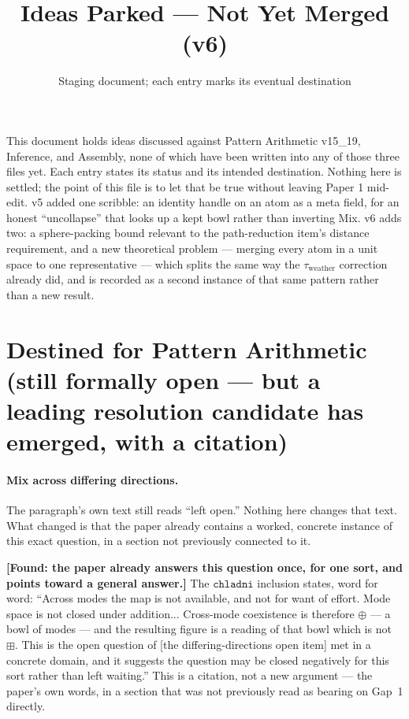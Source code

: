 \documentclass[11pt]{article}
\title{Ideas Parked --- Not Yet Merged (v6)}
\author{Staging document; each entry marks its eventual destination}
\date{}
\begin{document}
\maketitle

\noindent This document holds ideas discussed against Pattern Arithmetic
v15\_19, Inference, and Assembly, none of which have been written into
any of those three files yet. Each entry states its status and its
intended destination. Nothing here is settled; the point of this file
is to let that be true without leaving Paper 1 mid-edit.
v5 added one scribble: an identity handle on an atom as a meta field,
for an honest ``uncollapse'' that looks up a kept bowl rather than
inverting Mix. v6 adds two: a sphere-packing bound relevant to the
path-reduction item's distance requirement, and a new theoretical
problem --- merging every atom in a unit space to one representative
--- which splits the same way the $\tau_{\text{weather}}$ correction
already did, and is recorded as a second instance of that same pattern
rather than a new result.

\section{Destined for Pattern Arithmetic (still formally open ---
but a leading resolution candidate has emerged, with a citation)}

\paragraph{Mix across differing directions.} The paragraph's own text
still reads ``left open.'' Nothing here changes that text. What
changed is that the paper already contains a worked, concrete instance
of this exact question, in a section not previously connected to it.

\textbf{[Found: the paper already answers this question once, for one
sort, and points toward a general answer.]} The $\mathtt{chladni}$
inclusion states, word for word: ``Across modes the map is not
available, and not for want of effort. Mode space is not closed under
addition... Cross-mode coexistence is therefore $\oplus$ --- a bowl of
modes --- and the resulting figure is a reading of that bowl which is
not $\boxplus$. This is the open question of
[the differing-directions open item] met in a concrete domain,
and it suggests the question may be closed negatively for this sort
rather than left waiting.'' This is a citation, not a new argument ---
the paper's own words, in a section that was not previously read as
bearing on Gap~1 directly.
\end{document}
